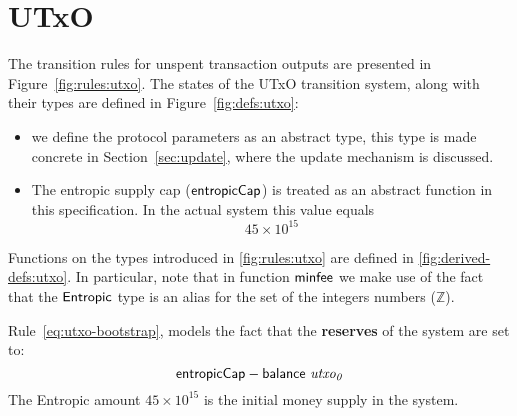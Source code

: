 \newcommand{\PPMMap}{\ensuremath{\type{PParams}}}
\newcommand{\Lmax}{\ensuremath{\mathbb{L}_{\var{max}}}}
\section{UTxO}
\label{sec:state-trans-utxo-1}

The transition rules for unspent transaction outputs are presented in
Figure~\ref{fig:rules:utxo}. The states of the UTxO transition system, along
with their types are defined in Figure~\ref{fig:defs:utxo}:
\begin{itemize}
\item we define the protocol parameters as an abstract type, this type is made
  concrete in Section~\ref{sec:update}, where the update mechanism is
  discussed.
\item The entropic supply cap ($\mathsf{entropicCap}$) is treated as an abstract
  function in this specification. In the actual system this value equals
  $$
  45 \times 10^{15}
  $$
\end{itemize}


Functions on the types introduced in \cref{fig:rules:utxo} are defined in
\cref{fig:derived-defs:utxo}. In particular, note that in function
$\mathsf{minfee}$ we make use of the fact that the $\mathsf{Entropic}$ type is an alias
for the set of the integers numbers ($\mathbb{Z}$).

Rule~\ref{eq:utxo-bootstrap}, models the fact that the \textbf{reserves} of
the system are set to:
$$ \mathsf{entropicCap} - \mathsf{balance}~ \mathit{utxo_0} $$
The Entropic amount $45 \times 10^{15}$ is the initial money supply in the
system.

